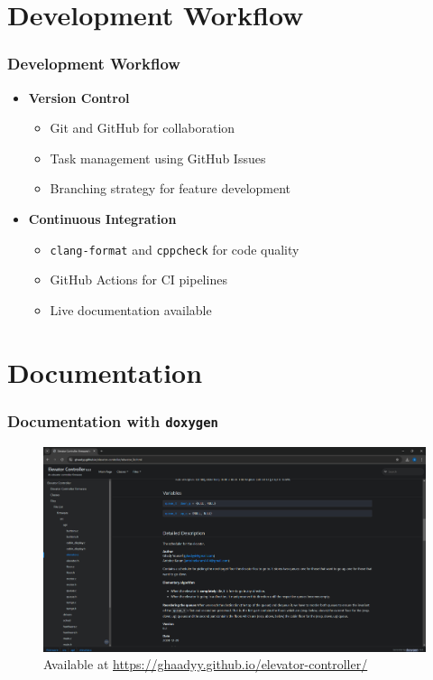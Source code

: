 \documentclass{beamer}
\begin{document}
\section{Development Workflow}
\begin{frame}
    \frametitle{Development Workflow}
    \begin{itemize}
        \item \textbf{Version Control}
              \begin{itemize}
                  \item Git and GitHub for collaboration
                  \item Task management using GitHub Issues
                  \item Branching strategy for feature development
              \end{itemize}
        \item \textbf{Continuous Integration}
              \begin{itemize}
                  \item \texttt{clang-format} and \texttt{cppcheck} for code quality
                  \item GitHub Actions for CI pipelines
                  \item Live documentation available
              \end{itemize}
    \end{itemize}
\end{frame}

\section{Documentation}
\begin{frame}
    \frametitle{Documentation with \texttt{doxygen}}
    \begin{figure}[h]
        \centering
        \includegraphics[width=1\textwidth]{assets/docs.png}
        \caption{
            Available at \href{https://ghaadyy.github.io/elevator-controller/}{https://ghaadyy.github.io/elevator-controller/}
        }
    \end{figure}
\end{frame}
\end{document}
